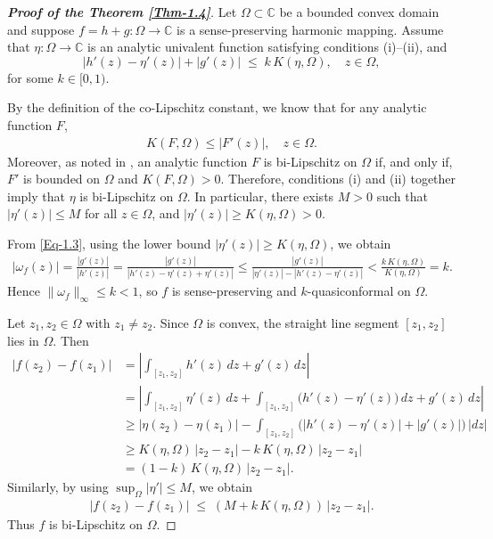 \documentclass[a4paper,12pt]{amsart}
\theoremstyle{plain}
\theoremstyle{definition}
\begin{document}
\begin{proof}[\bf Proof of the Theorem \ref{Thm-1.4}]
	Let $\Omega\subset\mathbb{C}$ be a bounded convex domain and suppose $f=h+g:\Omega\to\mathbb{C}$ is a sense-preserving harmonic mapping. Assume that $\eta:\Omega\to\mathbb{C}$ is an analytic univalent function satisfying conditions (i)–(ii), and
	\begin{equation}\label{Eq-1.3}
		|h'(z)-\eta'(z)|+|g'(z)| \;\le\; k\,K(\eta,\Omega), \quad z\in\Omega,
	\end{equation}
	for some $k\in[0,1)$.\vspace{2mm}
	
	By the definition of the co-Lipschitz constant, we know that for any analytic function $F$,
	\begin{align*}
		K(F,\Omega) \le |F'(z)|, \quad z\in\Omega.
	\end{align*}
	Moreover, as noted in \cite{Bhowmik-Satapati-Complex Sgn-2024}, an analytic function $F$ is bi-Lipschitz on $\Omega$ if, and only if, $F'$ is bounded on $\Omega$ and $K(F,\Omega)>0$. Therefore, conditions (i) and (ii) together imply that $\eta$ is bi-Lipschitz on $\Omega$. In particular, there exists $M>0$ such that $|\eta'(z)|\le M$ for all $z\in\Omega$, and $|\eta'(z)|\ge K(\eta,\Omega)>0$.
	
	From \eqref{Eq-1.3}, using the lower bound $|\eta'(z)|\ge K(\eta,\Omega)$, we obtain
	\begin{align*}
		|\omega_f(z)| = \frac{|g'(z)|}{|h'(z)|}
		= \frac{|g'(z)|}{|h'(z)-\eta'(z)+\eta'(z)|}
		\le \frac{|g'(z)|}{|\eta'(z)| - |h'(z)-\eta'(z)|}
		< \frac{k\,K(\eta,\Omega)}{K(\eta,\Omega)} = k.
	\end{align*}
	Hence $\|\omega_f\|_\infty \le k<1$, so $f$ is sense-preserving and $k$-quasiconformal on $\Omega$.
		
	Let $z_1,z_2\in\Omega$ with $z_1\ne z_2$. Since $\Omega$ is convex, the straight line segment $[z_1,z_2]$ lies in $\Omega$. Then
	\begin{align*}
		|f(z_2)-f(z_1)|
		&= \left|\int_{[z_1,z_2]} h'(z)\,dz + g'(z)\,dz \right| \\
		&= \left|\int_{[z_1,z_2]} \eta'(z)\,dz
		+ \int_{[z_1,z_2]} \big(h'(z)-\eta'(z)\big)\,dz + g'(z)\,dz \right| \\
		&\ge \left|\eta(z_2)-\eta(z_1)\right|
		- \int_{[z_1,z_2]} \big(|h'(z)-\eta'(z)|+|g'(z)|\big)\,|dz| \\
		&\ge K(\eta,\Omega)\,|z_2-z_1| - k\,K(\eta,\Omega)\,|z_2-z_1| \\
		&= (1-k)\,K(\eta,\Omega)\,|z_2-z_1|.
	\end{align*}
	Similarly, by using $\displaystyle\sup_\Omega |\eta'|\le M$, we obtain
	\begin{align*}
		|f(z_2)-f(z_1)| \;\le\; (M+k\,K(\eta,\Omega))\,|z_2-z_1|.
	\end{align*}
	Thus $f$ is bi-Lipschitz on $\Omega$.\vspace{2mm}
	

\end{proof}
\end{document}
